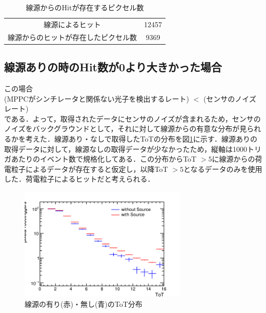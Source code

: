 \begin{table}
  \centering
  \caption{線源からのHitが存在するピクセル数}
  \label{tab:ext0}
  \begin{tabular}{cc}\hline
    線源によるヒット & 12457 \\
    線源からのヒットが存在したピクセル数 & 9369 \\ \hline
  \end{tabular}
\end{table}

\subsection*{線源ありの時のHit数が0より大きかった場合}
この場合\\

(MPPCがシンチレータと関係ない光子を検出するレート) $<$ (センサのノイズレート)\\

である．よって，取得されたデータにセンサのノイズが含まれるため，センサのノイズをバックグラウンドとして，それに対して線源からの有意な分布が見られるかを考えた．線源あり・なしで取得したToTの分布を図\ref{fig:exttot}に示す．線源ありの取得データに対して，線源なしの取得データが少なかったため，縦軸は1000トリガあたりのイベント数で規格化してある．この分布からToT $> 5$に線源からの荷電粒子によるデータが存在すると仮定し，以降ToT $>5$となるデータのみを使用した．荷電粒子によるヒットだと考えられる．

\begin{figure}[h]
  \centering
  \includegraphics[width=8cm]{./figure/extToT.png}
  \caption{線源の有り(赤)・無し(青)のToT分布}
  \label{fig:exttot}
\end{figure}


